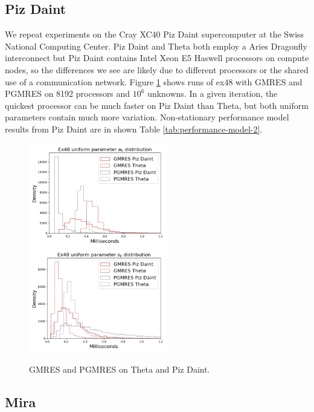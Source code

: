 \documentclass[sigconf, anonymous]{acmart}
\begin{document}
\subsection{Piz Daint}\label{sec:pizdaint}

We repeat experiments on the Cray XC40 Piz Daint supercomputer at the Swiss National Computing Center. 
Piz Daint and Theta both employ a Aries Dragonfly interconnect but Piz Daint contains Intel Xeon E5 Haswell  processors \cite{hammarlund2014haswell} on compute nodes, so the differences we see are likely due to different processors or the shared use of a communication network.
Figure \ref{fig:pizdaint} shows runs of ex48 with GMRES and PGMRES on 8192 processors and $10^6$ unknowns. 
In a given iteration, the quickest processor can be much faster on Piz Daint than Theta, but both uniform parameters contain much more variation.
Non-stationary performance model results from Piz Daint are in shown Table \ref{tab:performance-model-2}.

\begin{figure}[b]
\centering
\includegraphics[width=6cm]{../plots/THETA_PIZDAINT_ex48_8192_1000000_uniform_a_k.png} 
\includegraphics[width=6cm]{../plots/THETA_PIZDAINT_ex48_8192_1000000_uniform_s_k.png}
\caption{GMRES and PGMRES on Theta and Piz Daint.} \label{fig:pizdaint}
\end{figure}


\subsection{Mira}\label{sec:mira}
\end{document}

